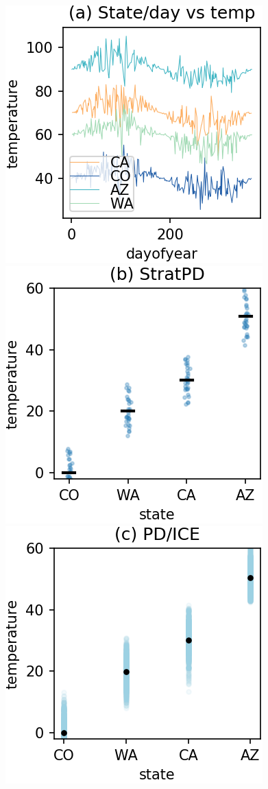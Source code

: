 \documentclass[12pt]{article}
\begin{document}
\begin{figure}[htbp]
\begin{center}
\includegraphics[scale=0.7]{images/dayofyear_vs_temp.png}
\includegraphics[scale=0.7]{images/state_vs_temp_stratpd.png}
\includegraphics[scale=0.7]{images/state_vs_temp_pdp.png}

\end{center}
\end{figure}
\end{document}
